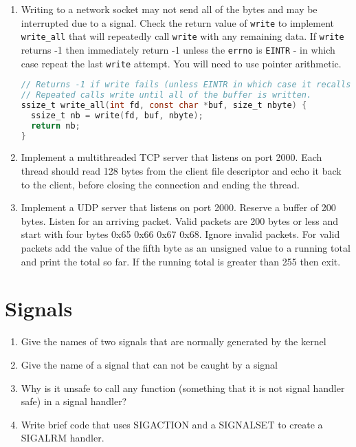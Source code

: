 \begin{enumerate}
\item Writing to a network socket may not send all of the bytes and may be interrupted due to a signal. Check the return value of \texttt{write} to implement \texttt{write\_all} that will repeatedly call \texttt{write} with any remaining data. If \texttt{write} returns -1 then immediately return -1 unless the \texttt{errno} is \texttt{EINTR} - in which case repeat the last \texttt{write} attempt. You will need to use pointer arithmetic.

\begin{lstlisting}[language=C]
// Returns -1 if write fails (unless EINTR in which case it recalls write
// Repeated calls write until all of the buffer is written.
ssize_t write_all(int fd, const char *buf, size_t nbyte) {
  ssize_t nb = write(fd, buf, nbyte);
  return nb;
}
\end{lstlisting}

\item Implement a multithreaded TCP server that listens on port 2000. Each thread should read 128 bytes from the client file descriptor and echo it back to the client, before closing the connection and ending the thread.

\item Implement a UDP server that listens on port 2000. Reserve a buffer of 200 bytes. Listen for an arriving packet. Valid packets are 200 bytes or less and start with four bytes 0x65 0x66 0x67 0x68. Ignore invalid packets. For valid packets add the value of the fifth byte as an unsigned value to a running total and print the total so far. If the running total is greater than 255 then exit.

\end{enumerate}

\section{Signals}

\begin{enumerate}
\item Give the names of two signals that are normally generated by the kernel
\item Give the name of a signal that can not be caught by a signal
\item Why is it unsafe to call any function (something that it is not signal handler safe) in a signal handler?
\item Write brief code that uses SIGACTION and a SIGNALSET to create a SIGALRM handler.
\end{enumerate}
